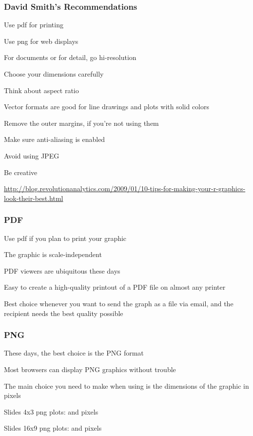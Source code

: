 \documentclass[12pt]{beamer}\usepackage[]{graphicx}\usepackage[]{color}
\begin{document}
\begin{frame}
\frametitle{David Smith's Recommendations}

\bi
  \item Use pdf for printing
  \item Use png for web displays
  \item For documents or for detail, go hi-resolution
  \item Choose your dimensions carefully
  \item Think about aspect ratio
  \item Vector formats are good for line drawings and plots with solid colors
  \item Remove the outer margins, if you're not using them
  \item Make sure anti-aliasing is enabled
  \item Avoid using JPEG
  \item Be creative
\ei

{\tiny \url{http://blog.revolutionanalytics.com/2009/01/10-tips-for-making-your-r-graphics-look-their-best.html}}

\end{frame}


\begin{frame}
\frametitle{PDF}

\bi
  \item Use pdf if you plan to print your graphic
  \item The graphic is scale-independent
  \item PDF viewers are ubiquitous these days
  \item Easy to create a high-quality printout of a PDF file on almost any printer
  \item Best choice whenever you want to send the graph as a file via email, 
  and the recipient needs the best quality possible
\ei
\eb

\end{frame}


\begin{frame}
\frametitle{PNG}

\bi
  \item These days, the best choice is the PNG format
  \item Most browsers can display PNG graphics without trouble
  \item The main choice you need to make when using  is the 
  dimensions of the graphic in pixels
  \item Slides 4x3 png plots:  and  pixels
  \item Slides 16x9 png plots:  and  pixels
\ei
\eb

\end{frame}
\end{document}
